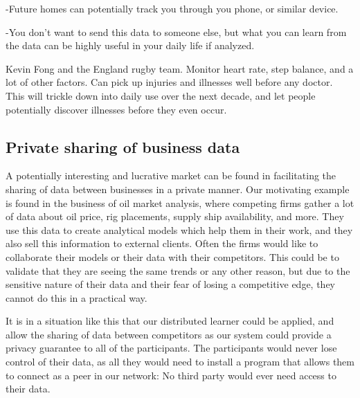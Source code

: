 -Future homes can potentially track you through you phone, or similar device. 

-You don't want to send this data to someone else, but what you can learn from the data can be highly useful in your daily life if analyzed. 

Kevin Fong and the England rugby team. Monitor heart rate, step balance, and a lot of other factors. Can pick up injuries and illnesses well before any doctor. This will trickle down into daily use over the next decade, and let people potentially discover illnesses before they even occur. 

\subsection{Private sharing of business data}
A potentially interesting and lucrative market can be found in facilitating the sharing of data between businesses in a private manner. Our motivating example is found in the business of oil market analysis, where competing firms gather a lot of data about oil price, rig placements, supply ship availability, and more. They use this data to create analytical models which help them in their work, and they also sell this information to external clients. Often the firms would like to collaborate their models or their data with their competitors. This could be to validate that they are seeing the same trends or any other reason, but due to the sensitive nature of their data and their fear of losing a competitive edge, they cannot do this in a practical way. 

It is in a situation like this that our distributed learner could be applied, and allow the sharing of data between competitors as our system could provide a privacy guarantee to all of the participants. The participants would never lose control of their data, as all they would need to install a program that allows them to connect as a peer in our network: No third party would ever need access to their data.   




\cleardoublepage